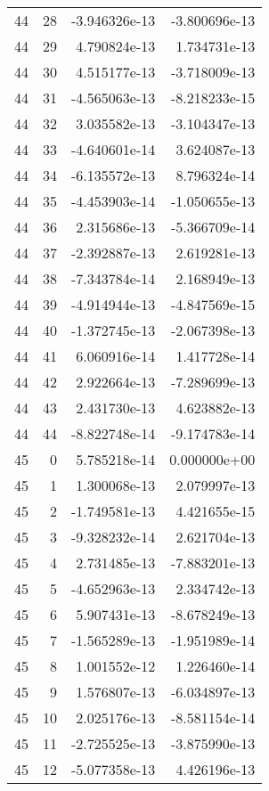 \begin{tabular}{rrrr}
  44 &   28 & -3.946326e-13 & -3.800696e-13 \\
  44 &   29 &  4.790824e-13 &  1.734731e-13 \\
  44 &   30 &  4.515177e-13 & -3.718009e-13 \\
  44 &   31 & -4.565063e-13 & -8.218233e-15 \\
  44 &   32 &  3.035582e-13 & -3.104347e-13 \\
  44 &   33 & -4.640601e-14 &  3.624087e-13 \\
  44 &   34 & -6.135572e-13 &  8.796324e-14 \\
  44 &   35 & -4.453903e-14 & -1.050655e-13 \\
  44 &   36 &  2.315686e-13 & -5.366709e-14 \\
  44 &   37 & -2.392887e-13 &  2.619281e-13 \\
  44 &   38 & -7.343784e-14 &  2.168949e-13 \\
  44 &   39 & -4.914944e-13 & -4.847569e-15 \\
  44 &   40 & -1.372745e-13 & -2.067398e-13 \\
  44 &   41 &  6.060916e-14 &  1.417728e-14 \\
  44 &   42 &  2.922664e-13 & -7.289699e-13 \\
  44 &   43 &  2.431730e-13 &  4.623882e-13 \\
  44 &   44 & -8.822748e-14 & -9.174783e-14 \\
  45 &    0 &  5.785218e-14 &  0.000000e+00 \\
  45 &    1 &  1.300068e-13 &  2.079997e-13 \\
  45 &    2 & -1.749581e-13 &  4.421655e-15 \\
  45 &    3 & -9.328232e-14 &  2.621704e-13 \\
  45 &    4 &  2.731485e-13 & -7.883201e-13 \\
  45 &    5 & -4.652963e-13 &  2.334742e-13 \\
  45 &    6 &  5.907431e-13 & -8.678249e-13 \\
  45 &    7 & -1.565289e-13 & -1.951989e-14 \\
  45 &    8 &  1.001552e-12 &  1.226460e-14 \\
  45 &    9 &  1.576807e-13 & -6.034897e-13 \\
  45 &   10 &  2.025176e-13 & -8.581154e-14 \\
  45 &   11 & -2.725525e-13 & -3.875990e-13 \\
  45 &   12 & -5.077358e-13 &  4.426196e-13 \\

\end{tabular}
